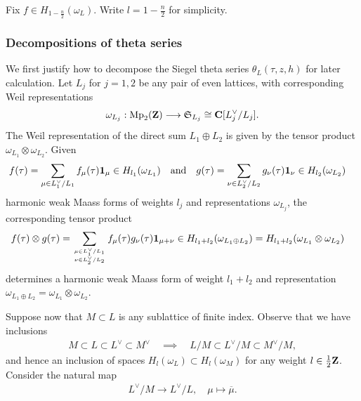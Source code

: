 \documentclass{amsart}
\theoremstyle{definition}
\theoremstyle{definition}
\theoremstyle{definition}
\begin{document}
Fix $f \in H_{1-\frac{n}{2}}(\omega_L)$. Write $l = 1 - \frac{n}{2}$ for simplicity. 

\subsubsection{Decompositions of theta series}

We first justify how to decompose the Siegel theta series $\theta_L(\tau, z, h)$ for later calculation. 
Let $L_j$ for $j=1,2$ be any pair of even lattices, with corresponding Weil representations 
\begin{align*} \omega_{L_j}: \operatorname{Mp}_2({\bf{Z}}) \longrightarrow \mathfrak{S}_{L_j} \cong {\bf{C}}[L_j^{\vee}/L_j]. \end{align*}
The Weil representation of the direct sum $L_1 \oplus L_2$ is given by the tensor product
 $\omega_{L_1} \otimes \omega_{L_2}$. Given 
\begin{align*} f(\tau) &= \sum\limits_{\mu \in L_1^{\vee}/L_1} f_{\mu}(\tau) {\bf{1}}_{\mu} \in H_{l_1}(\omega_{L_1}) 
\quad \text{and} \quad g(\tau) = \sum\limits_{\nu \in L_2^{\vee}/L_2} g_{\nu}(\tau) {\bf{1}}_{\nu} \in H_{l_2}(\omega_{L_2}) \end{align*}
harmonic weak Maass forms of weights $l_j$ and representations $\omega_{L_j}$, the corresponding tensor product 
\begin{align*} f(\tau) \otimes g(\tau) &= \sum\limits_{ \mu \in L_1^{\vee}/ L_1 \atop \nu \in L_2^{\vee}/ L_2} f_{\mu}(\tau) g_{\nu}(\tau) {\bf{1}}_{\mu + \nu}
\in H_{l_1 + l_2}(\omega_{L_1 \oplus L_2}) = H_{l_1 + l_2}(\omega_{L_1} \otimes \omega_{L_2}) \end{align*}
determines a harmonic weak Maass form of weight $l_1 + l_2$ and representation 
$\omega_{L_1 \oplus L_2} = \omega_{L_1} \otimes \omega_{L_2}$.

Suppose now that $M \subset L$ is any sublattice of finite index. Observe that we have inclusions 
\begin{align*} M \subset L \subset L^{\vee} \subset M^{\vee} \quad \implies \quad
L /M \subset L^{\vee}/M \subset M^{\vee}/M,\end{align*}
and hence an inclusion of spaces $H_l(\omega_L) \subset H_l(\omega_M)$ for any weight $l \in \frac{1}{2} {\bf{Z}}$.
Consider the natural map \begin{align*} L^{\vee}/M \longrightarrow L^{\vee}/L, \quad \mu \longmapsto \overline{\mu}. \end{align*}
\end{document}
